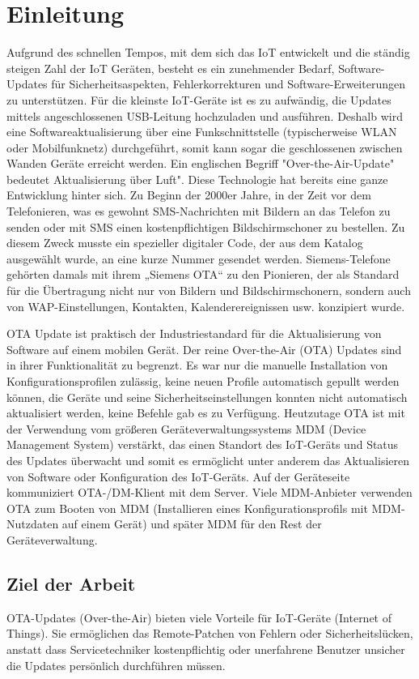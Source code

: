 \chapter{Einleitung}
\label{sec:intro}
Aufgrund des schnellen Tempos, mit dem sich das IoT entwickelt und die ständig steigen Zahl der IoT Geräten, besteht es ein zunehmender Bedarf, Software-Updates für Sicherheitsaspekten, Fehlerkorrekturen und Software-Erweiterungen zu unterstützen. Für die kleinste IoT-Geräte ist es zu aufwändig, die Updates mittels angeschlossenen USB-Leitung hochzuladen und ausführen. Deshalb wird eine Softwareaktualisierung über eine Funkschnittstelle (typischerweise WLAN oder Mobilfunknetz) durchgeführt, somit kann sogar die geschlossenen zwischen Wanden Geräte erreicht werden. Ein englischen Begriff "Over-the-Air-Update" bedeutet Aktualisierung über Luft". Diese Technologie hat bereits eine ganze Entwicklung hinter sich. Zu Beginn der 2000er Jahre, in der Zeit vor dem Telefonieren, was es gewohnt SMS-Nachrichten mit Bildern an das Telefon zu senden oder mit SMS einen kostenpflichtigen Bildschirmschoner zu bestellen. Zu diesem Zweck musste ein spezieller digitaler Code, der aus dem Katalog ausgewählt wurde, an eine kurze Nummer gesendet werden. Siemens-Telefone gehörten damals mit ihrem „Siemens OTA“ zu den Pionieren, der als Standard für die Übertragung nicht nur von Bildern und Bildschirmschonern, sondern auch von WAP-Einstellungen, Kontakten, Kalenderereignissen usw. konzipiert wurde.

OTA Update ist praktisch der Industriestandard für die Aktualisierung von Software auf einem mobilen Gerät. Der reine Over-the-Air (OTA) Updates sind in ihrer Funktionalität zu begrenzt. Es war nur die manuelle Installation von Konfigurationsprofilen zulässig, keine neuen Profile automatisch gepullt werden können, die Geräte und seine Sicherheitseinstellungen konnten nicht automatisch aktualisiert werden, keine Befehle gab es zu Verfügung. Heutzutage OTA ist mit der Verwendung vom größeren Geräteverwaltungssystems MDM (Device Management System) verstärkt, das einen Standort des IoT-Geräts und Status des Updates überwacht und somit es ermöglicht unter anderem das Aktualisieren von Software oder Konfiguration des IoT-Geräts. Auf der Geräteseite kommuniziert OTA-/DM-Klient mit dem Server. Viele MDM-Anbieter verwenden OTA zum Booten von MDM (Installieren eines Konfigurationsprofils mit MDM-Nutzdaten auf einem Gerät) und später MDM für den Rest der Geräteverwaltung.

\section{Ziel der Arbeit}
\label{sec:intro:ziel} 
OTA-Updates (Over-the-Air) bieten viele Vorteile für IoT-Geräte (Internet of Things). Sie ermöglichen das Remote-Patchen von Fehlern oder Sicherheitslücken, anstatt dass Servicetechniker kostenpflichtig oder unerfahrene Benutzer unsicher die Updates persönlich durchführen müssen. 

